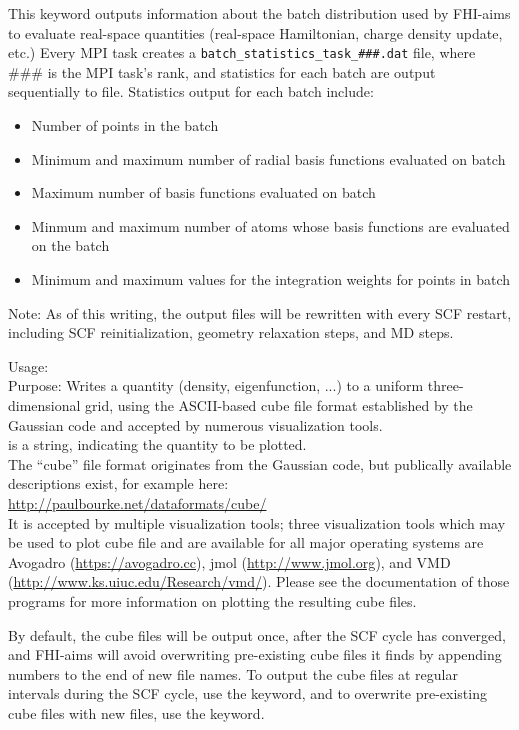 This keyword outputs information about the batch distribution used by FHI-aims to evaluate
real-space quantities (real-space Hamiltonian, charge density update, etc.)  Every MPI task
creates a \texttt{batch\_statistics\_task\_\#\#\#.dat} file, where \#\#\# is the MPI task's
rank, and statistics for each batch are output sequentially to file.  Statistics output for
each batch include:
\begin{itemize}
  \item Number of points in the batch
  \item Minimum and maximum number of radial basis functions evaluated on batch
  \item Maximum number of basis functions evaluated on batch
  \item Minmum and maximum number of atoms whose basis functions are evaluated on the batch
  \item Minimum and maximum values for the integration weights for points in batch
\end{itemize}
Note:  As of this writing, the output files will be rewritten with every SCF restart, including
SCF reinitialization, geometry relaxation steps, and MD steps.

{
  \noindent
  Usage:    \\[1.0ex]
  Purpose: Writes a quantity (density, eigenfunction, ...) to a
    uniform three-dimensional grid, using the ASCII-based cube file
    format established by the Gaussian code and accepted by numerous
    visualization tools. \\[1.0ex]
   is a string, indicating the quantity to be plotted. \\
}
The ``cube'' file format originates from the Gaussian code, but
publically available descriptions exist, for example here: \\[1.0ex]
 \url{http://paulbourke.net/dataformats/cube/} \\[1.0ex]
It is accepted by multiple visualization tools; three visualization
tools which may be used to plot cube file and are available for all
major operating systems are Avogadro (\url{https://avogadro.cc}), jmol
(\url{http://www.jmol.org}), and VMD
(\url{http://www.ks.uiuc.edu/Research/vmd/}).  Please see the documentation
of those programs for more information on plotting the resulting cube files.

By default, the cube files will be output once, after the SCF cycle has
converged, and FHI-aims will avoid overwriting pre-existing cube files it finds
by appending numbers to the end of new file names.  To output the cube files at
regular intervals during the SCF cycle, use the
 keyword, and to overwrite pre-existing
cube files with new files, use the 
keyword.

